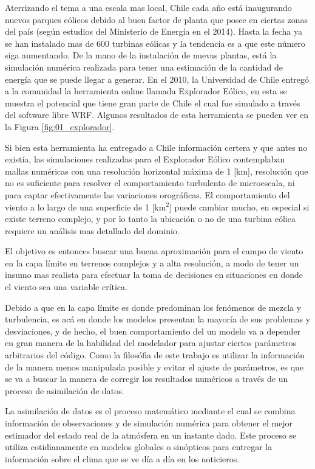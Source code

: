 Aterrizando el tema a una escala mas local, Chile cada año está inaugurando nuevos parques eólicos debido al buen factor de planta que posee en ciertas zonas del país (según estudios del Ministerio de Energía en el 2014). Hasta la fecha ya se han instalado mas de 600 turbinas eólicas y la tendencia es a que este número siga aumentando. De la mano de la instalación de nuevas plantas, está la simulación numérica realizada para tener una estimación de la cantidad de energía que se puede llegar a generar. En el 2010, la Universidad de Chile entregó a la comunidad la herramienta online llamada Explorador Eólico, en esta se muestra el potencial que tiene gran parte de Chile el cual fue simulado a través del software libre WRF. Algunos resultados de esta herramienta se pueden ver en la Figura \ref{fig:01_explorador}.


Si bien esta herramienta ha entregado a Chile información certera y que antes no existía, las simulaciones realizadas para el Explorador Eólico contemplaban mallas numéricas con una resolución horizontal máxima de 1 [km], resolución que no es suficiente para resolver el comportamiento turbulento de microescala, ni para captar efectivamente las variaciones orográficas. El comportamiento del viento a lo largo de una superficie de 1 [km$^2$] puede cambiar mucho, en especial si existe terreno complejo, y por lo tanto la ubicación o no de una turbina eólica requiere un análisis mas detallado del dominio.

El objetivo es entonces buscar una buena aproximación para el campo de viento en la capa límite en terrenos complejos y a alta resolución, a modo de tener un insumo mas realista para efectuar la toma de decisiones en situaciones en donde el viento sea una variable crítica.

Debido a que en la capa límite es donde predominan los fenómenos de mezcla y turbulencia, es acá en donde los modelos presentan la mayoría de sus problemas y desviaciones, y de hecho, el buen comportamiento del un modelo va a depender en gran manera de la habilidad del modelador para ajustar ciertos parámetros arbitrarios del código. Como la filosófia de este trabajo es utilizar la información de la manera menos manipulada posible y evitar el ajuste de parámetros, es que se va a buscar la manera de corregir los resultados numéricos a través de un proceso de asimilación de datos.

La asimilación de datos es el proceso matemático mediante el cual se combina información de observaciones y de simulación numérica para obtener el mejor estimador del estado real de la atmósfera en un instante dado. Este proceso se utiliza cotidianamente en modelos globales o sinópticos para entregar la información sobre el clima que se ve día a día en los noticieros.

